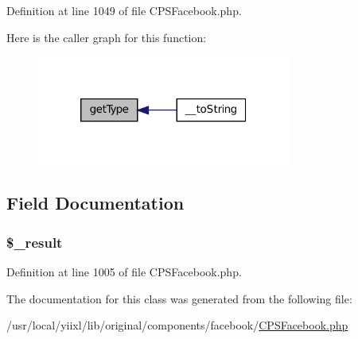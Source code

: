 Definition at line 1049 of file CPSFacebook.php.








Here is the caller graph for this function:\nopagebreak
\begin{figure}[H]
\begin{center}
\leavevmode
\includegraphics[width=236pt]{classCPSFacebookApiException_a830b5c75df72b32396701bc563fbe3c7_icgraph}
\end{center}
\end{figure}




\subsection{Field Documentation}
\hypertarget{classCPSFacebookApiException_a4880874cac761eb1c11879f22950db5b}{
\subsubsection[{\$\_\-result}]{\setlength{\rightskip}{0pt plus 5cm}\$\_\-result}}
\label{classCPSFacebookApiException_a4880874cac761eb1c11879f22950db5b}


Definition at line 1005 of file CPSFacebook.php.



The documentation for this class was generated from the following file:\begin{DoxyCompactItemize}
\item 
/usr/local/yiixl/lib/original/components/facebook/\hyperlink{CPSFacebook_8php}{CPSFacebook.php}\end{DoxyCompactItemize}
